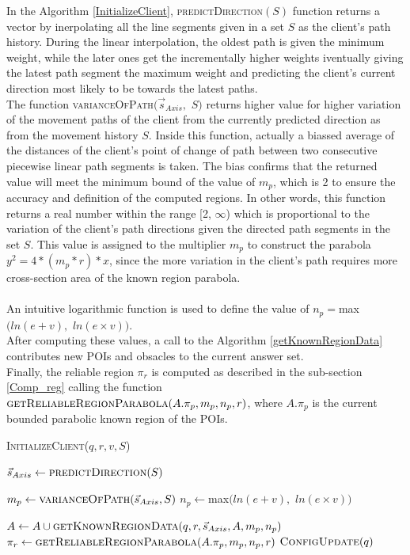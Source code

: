 In the Algorithm \ref{InitializeClient}, \textsc{predictDirection}$(S)$ function returns a vector by inerpolating all the line segments given in a set $S$ as the client's path history. During the linear interpolation, the oldest path is given the minimum weight, while the later ones get the incrementally higher weights iventually giving the latest path segment the maximum weight and predicting the client's current direction most likely to be towards the latest paths.\\
The function \textsc{varianceOfPath$(\vec{s}_{Axis},$ $S)$} returns higher value for higher variation of the movement paths of the client from the currently predicted direction as from the movement history $S$. Inside this function, actually a biassed average of the distances of the client's point of change of path between two consecutive piecewise linear path segments is taken. The bias confirms that the returned value will meet the minimum bound of the value of $m_p$, which is 2 to ensure the accuracy and definition of the computed regions. In other words, this function returns a real number within the range [2, $\infty$) which is proportional to the variation of the client's path directions given the directed path segments in the set $S$. This value is assigned to the multiplier $m_p$ to construct the parabola $y^2 = 4*(m_p*r)*x$, since the more variation in the client's path requires more cross-section area of the known region parabola.\\\\
An intuitive logarithmic function is used to define the value of $n_p = $max$( ln( e + v ),$ $ln(e \times v))$.\\
After computing these values, a call to the Algorithm \ref{getKnownRegionData} contributes new POIs and obsacles to the current answer set. \\
Finally, the reliable region $\pi_r$ is computed as described in the sub-section \ref{Comp_reg} calling the function $\textsc{getReliableRegionParabola}(A.\pi_p,m_p,n_p,r)$, where $A.\pi_p$ is the current bounded parabolic known region of the POIs.


\begin{algorithm}
\caption{\textsc{InitializeClient}($q, r, v, S$)}
\label{InitializeClient}
   
    
	 $\vec{s}_{Axis} \gets \textsc{predictDirection}(S)$ \;
	
	 $m_p \gets \textsc{varianceOfPath}(\vec{s}_{Axis}, S)$ \;
	 $n_p \gets $max$( ln( e + v ),$ $ln(e \times v))$ \;
	
	 $A \gets A \cup \textsc{getKnownRegionData}(q, r, \vec{s}_{Axis}, A, m_p, n_p)$ \;
	 $\pi_r \gets \textsc{getReliableRegionParabola}(A.\pi_p,m_p,n_p,r)$ \;
	 $\textsc{ConfigUpdate}(q)$\;
	 
\end{algorithm}
\vspace{5pt}


